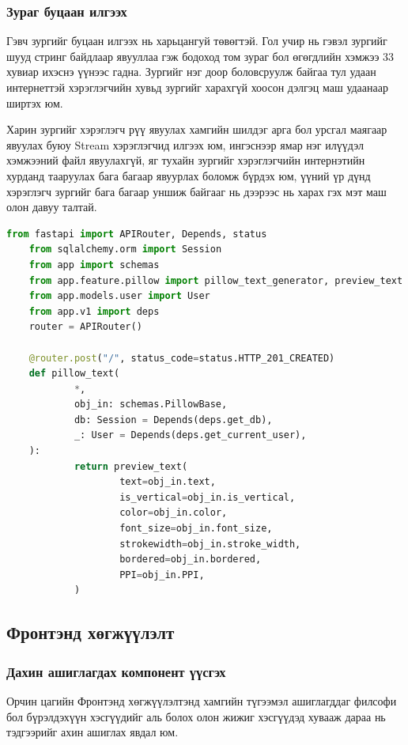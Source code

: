 \subsubsection{Зураг буцаан илгээх}
Гэвч зургийг буцаан илгээх нь харьцангуй төвөгтэй. Гол учир нь гэвэл зургийг шууд стринг байдлаар явууллаа гэж бодоход том зураг бол өгөгдлийн хэмжээ 33 хувиар ихэснэ үүнээс гадна. Зургийг нэг доор боловсруулж байгаа тул удаан интернеттэй хэрэглэгчийн хувьд зургийг харахгүй хоосон дэлгэц маш удаанаар ширтэх юм.

Харин зургийг хэрэглэгч рүү явуулах хамгийн шилдэг арга бол урсгал маягаар явуулах буюу Stream хэрэглэгчид илгээх юм, ингэснээр ямар нэг илүүдэл хэмжээний файл явуулахгүй, яг тухайн зургийг хэрэглэгчийн интернэтийн хурданд тааруулах бага багаар явуурлах боломж бүрдэх юм, үүний үр дүнд хэрэглэгч зургийг бага багаар уншиж байгааг нь дээрээс нь харах гэх мэт маш олон давуу талтай.
\begin{lstlisting}[language=Python,caption={Зураг буцаан user-лүү илгээх endpoint},frame=single]
	from fastapi import APIRouter, Depends, status
	from sqlalchemy.orm import Session
	from app import schemas
	from app.feature.pillow import pillow_text_generator, preview_text
	from app.models.user import User
	from app.v1 import deps
	router = APIRouter()
	
	@router.post("/", status_code=status.HTTP_201_CREATED)
	def pillow_text(
			*,
			obj_in: schemas.PillowBase,
			db: Session = Depends(deps.get_db),
			_: User = Depends(deps.get_current_user),
	):
			return preview_text(
					text=obj_in.text,
					is_vertical=obj_in.is_vertical,
					color=obj_in.color,
					font_size=obj_in.font_size,
					strokewidth=obj_in.stroke_width,
					bordered=obj_in.bordered,
					PPI=obj_in.PPI,
			)
	\end{lstlisting}

\subsection{Фронтэнд хөгжүүлэлт}
\subsubsection{Дахин ашиглагдах компонент үүсгэх}
Орчин цагийн Фронтэнд хөгжүүлэлтэнд хамгийн түгээмэл ашиглагддаг филсофи бол бүрэлдэхүүн хэсгүүдийг аль болох олон жижиг хэсгүүдэд хувааж дараа нь тэдгээрийг ахин ашиглах явдал юм.

